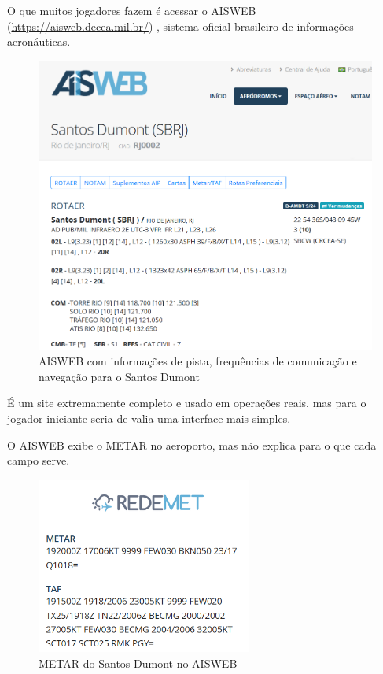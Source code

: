 O que muitos jogadores fazem é acessar o AISWEB (\url{https://aisweb.decea.mil.br/}) , sistema oficial brasileiro
de informações aeronáuticas. 

\begin{figure}[ht]
    \begin{center}
    \includegraphics[width=400pt]{img/aisweb.png}
    \caption{AISWEB com informações de pista, frequências de comunicação e navegação para o Santos Dumont}
    \label{fig:aisweb}
    \end{center}
\end{figure}

É um site extremamente completo e usado em operações reais, mas para o jogador iniciante seria 
de valia uma interface mais simples.

O AISWEB exibe o METAR no aeroporto, mas não explica para o que cada campo serve.

\begin{figure}[ht]
    \begin{center}
    \includegraphics[width=200pt]{img/metar-aisweb.png}
    \caption{METAR do Santos Dumont no AISWEB}
    \label{fig:aisweb}
    \end{center}
\end{figure}

